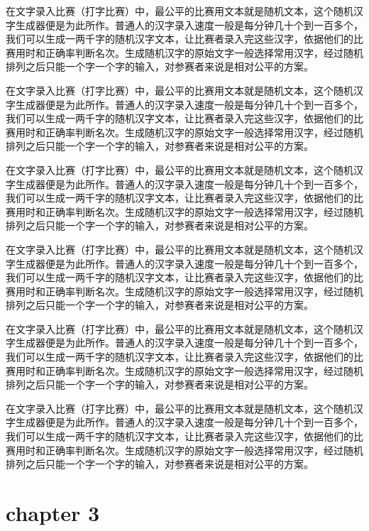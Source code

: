 \documentclass[12pt,hyperref,UTF8]{ctexbook}
\begin{document}
在文字录入比赛（打字比赛）中，最公平的比赛用文本就是随机文本，这个随机汉字生成器便是为此所作。普通人的汉字录入速度一般是每分钟几十个到一百多个，我们可以生成一两千字的随机汉字文本，让比赛者录入完这些汉字，依据他们的比赛用时和正确率判断名次。生成随机汉字的原始文字一般选择常用汉字，经过随机排列之后只能一个字一个字的输入，对参赛者来说是相对公平的方案。

在文字录入比赛（打字比赛）中，最公平的比赛用文本就是随机文本，这个随机汉字生成器便是为此所作。普通人的汉字录入速度一般是每分钟几十个到一百多个，我们可以生成一两千字的随机汉字文本，让比赛者录入完这些汉字，依据他们的比赛用时和正确率判断名次。生成随机汉字的原始文字一般选择常用汉字，经过随机排列之后只能一个字一个字的输入，对参赛者来说是相对公平的方案。

在文字录入比赛（打字比赛）中，最公平的比赛用文本就是随机文本，这个随机汉字生成器便是为此所作。普通人的汉字录入速度一般是每分钟几十个到一百多个，我们可以生成一两千字的随机汉字文本，让比赛者录入完这些汉字，依据他们的比赛用时和正确率判断名次。生成随机汉字的原始文字一般选择常用汉字，经过随机排列之后只能一个字一个字的输入，对参赛者来说是相对公平的方案。

在文字录入比赛（打字比赛）中，最公平的比赛用文本就是随机文本，这个随机汉字生成器便是为此所作。普通人的汉字录入速度一般是每分钟几十个到一百多个，我们可以生成一两千字的随机汉字文本，让比赛者录入完这些汉字，依据他们的比赛用时和正确率判断名次。生成随机汉字的原始文字一般选择常用汉字，经过随机排列之后只能一个字一个字的输入，对参赛者来说是相对公平的方案。


在文字录入比赛（打字比赛）中，最公平的比赛用文本就是随机文本，这个随机汉字生成器便是为此所作。普通人的汉字录入速度一般是每分钟几十个到一百多个，我们可以生成一两千字的随机汉字文本，让比赛者录入完这些汉字，依据他们的比赛用时和正确率判断名次。生成随机汉字的原始文字一般选择常用汉字，经过随机排列之后只能一个字一个字的输入，对参赛者来说是相对公平的方案。

在文字录入比赛（打字比赛）中，最公平的比赛用文本就是随机文本，这个随机汉字生成器便是为此所作。普通人的汉字录入速度一般是每分钟几十个到一百多个，我们可以生成一两千字的随机汉字文本，让比赛者录入完这些汉字，依据他们的比赛用时和正确率判断名次。生成随机汉字的原始文字一般选择常用汉字，经过随机排列之后只能一个字一个字的输入，对参赛者来说是相对公平的方案。

\cleardoublepage
\chapter{chapter 3}
\end{document}
